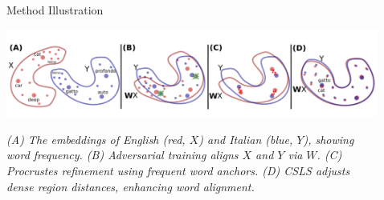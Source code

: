 \documentclass[final]{beamer}
\newlength{\sepwid}
\newlength{\onecolwid}
\newlength{\twocolwid}
\begin{document}
\begin{frame}[t]
\begin{columns}[t]
\begin{column}{\onecolwid}
\end{column} 

\begin{column}{\sepwid}\end{column} 

\begin{column}{\twocolwid}

\begin{columns}[t,totalwidth=\twocolwid]







\begin{column}{\twocolwid}


\begin{block}{Method Illustration}
\begin{center}
    \includegraphics[width=1.0\linewidth]{figures/figure1.png} %
\end{center}
\textit{(A) The embeddings of English (red, \(X\)) and Italian (blue, \(Y\)), showing word frequency. (B) Adversarial training aligns \(X\) and \(Y\) via \(W\). (C) Procrustes refinement using frequent word anchors. (D) CSLS adjusts dense region distances, enhancing word alignment.}
\end{block}


\end{column}

\end{columns} 



\end{column}
\end{columns}
\end{frame}
\end{document}
